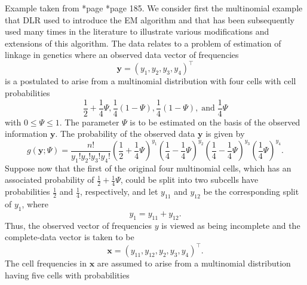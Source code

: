 \begin{exam} \label{exam: em_mutlinomial_eg}
    Example taken from \cite{McLachlanGeoffreyJohn2008TEaa}*{page } \cite{KroeseDirkP2013SMaC}*{page 185}. We consider first the multinomial example that DLR used to introduce the EM algorithm and that has been subsequently used many times in the literature to illustrate various modifications and extensions of this algorithm. The data relates to a problem of estimation of linkage in genetics where an observed data vector of frequencies
    \begin{equation*}
        \bm{y} = (y_1 , y_2 , y_3 , y_4)^{\intercal}
    \end{equation*}
    is a postulated to arise from a multinomial distribution with four cells with cell probabilities
    \begin{equation*}
        \frac{1}{2} + \frac{1}{4} \Psi , \frac{1}{4} \left( 1 - \Psi \right) , \frac{1}{4} \left( 1 - \Psi \right), \; \text{and} \; \frac{1}{4} \Psi
    \end{equation*}
    with $0 \leq \Psi \leq 1$. The parameter $\Psi$ is to be estimated on the basis of the observed information $\bm{y}$. The probability of the observed data $\bm{y}$ is given by
    \begin{equation*}
        g (\bm{y} ; \Psi) = \frac{n!}{y_1 ! y_2 ! y_3 ! y_4 !} \left( \frac{1}{2} + \frac{1}{4} \Psi \right)^{y_1} \left( \frac{1}{4} - \frac{1}{4} \Psi \right)^{y_2} \left( \frac{1}{4} - \frac{1}{4} \Psi \right)^{y_3} \left( \frac{1}{4} \Psi \right)^{y_4}.
    \end{equation*}
    Suppose now that the first of the original four multinomial cells, which has an associated probability of $\frac{1}{2} + \frac{1}{4} \Psi$, could be split into two subcells have probabilities $\frac{1}{2}$ and $\frac{1}{4}$, respectively, and let $y_{11}$ and $y_{12}$ be the corresponding split of $y_1$, where
    \begin{equation*}
        y_1 = y_{11} + y_{12}.
    \end{equation*}
    Thus, the observed vector of frequencies $y$ is viewed as being incomplete and the complete-data vector is taken to be
    \begin{equation*}
        \bm{x} = (y_{11} , y_{12} , y_{2} , y_{3} , y_{4})^{\intercal}.
    \end{equation*}
    The cell frequencies in $\bm{x}$ are assumed to arise from a multinomial distribution having five cells with probabilities
    \begin{equation*}

\end{equation*}
\end{exam}
